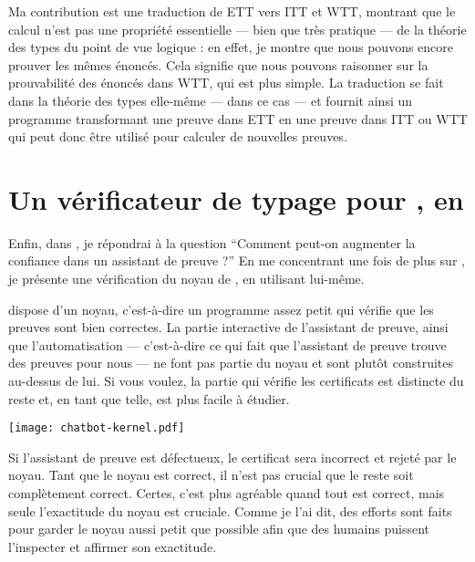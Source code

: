 Ma contribution est une traduction de \acrshort{ETT} vers \acrshort{ITT} et
\acrshort{WTT}, montrant que le calcul n'est pas une propriété essentielle ---
bien que très pratique --- de la théorie des types du point de vue logique : en
effet, je montre que nous pouvons encore prouver les mêmes énoncés.
Cela signifie que nous pouvons raisonner sur la prouvabilité des énoncés dans
\acrshort{WTT}, qui est plus simple.
La traduction se fait dans la théorie des types elle-même --- dans ce cas \Coq
--- et fournit ainsi un programme transformant une preuve dans \acrshort{ETT} en
une preuve dans \acrshort{ITT} ou \acrshort{WTT} qui peut donc être utilisé
pour calculer de nouvelles preuves.

\section{Un vérificateur de typage pour \Coq, en \Coq}

Enfin, dans , je répondrai à la question ``Comment
peut-on augmenter la confiance dans un assistant de preuve ?'' En me concentrant
une fois de plus sur \Coq, je présente une vérification du noyau de \Coq, en
utilisant \Coq lui-même.

\Coq dispose d'un noyau, c'est-à-dire un programme assez petit qui vérifie que
les preuves sont bien correctes. La partie interactive de l'assistant de preuve,
ainsi que l'automatisation --- c'est-à-dire ce qui fait que l'assistant de
preuve trouve des preuves pour nous --- ne font pas partie du noyau et sont
plutôt construites au-dessus de lui.
Si vous voulez, la partie qui vérifie les certificats est distincte du reste et,
en tant que telle, est plus facile à étudier.

\begin{center}
  \texttt{[image: chatbot-kernel.pdf]}
\end{center}

Si l'assistant de preuve est défectueux, le certificat sera incorrect et rejeté
par le noyau. Tant que le noyau est correct, il n'est pas crucial que le reste
soit complètement correct. Certes, c'est plus agréable quand tout est correct,
mais seule l'exactitude du noyau est cruciale.
Comme je l'ai dit, des efforts sont faits pour garder le noyau aussi petit que
possible afin que des humains puissent l'inspecter et affirmer son exactitude.

